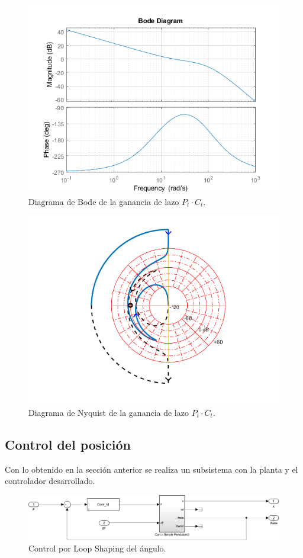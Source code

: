 \begin{figure}[H]
	\centering
	\includegraphics[width=0.6\linewidth]{ImagenesLoop Shaping/Bode_t}
	\caption{Diagrama de Bode de la ganancia de lazo $P_t \cdot C_t$.}	
	\label{fig:bode_t}
\end{figure}
\begin{figure}[H]
	\centering
	\includegraphics[width=0.6\linewidth]{ImagenesLoop Shaping/Nyqlog_t}
	\caption{Diagrama de Nyquist de la ganancia de lazo $P_t \cdot C_t$.}	
	\label{fig:nyqlog_t}
\end{figure}

\subsection{Control del posición}
\label{sec:ls_pos}

Con lo obtenido en la sección anterior se realiza un subsistema con la planta y el controlador desarrollado.

\begin{figure}[H]
	\centering
	\includegraphics[width=0.6\linewidth]{ImagenesLoop Shaping/ls_t}
	\caption{Control por Loop Shaping del ángulo.}	
	\label{fig:ls_t}
\end{figure}

